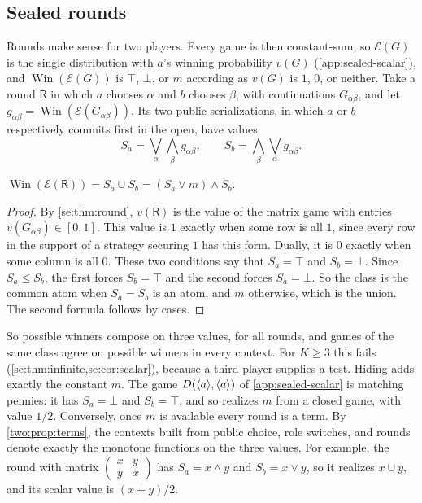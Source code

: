 \subsection{Sealed rounds}

Rounds make sense for two players. Every game is then constant-sum, so $\mathcal E(G)$ is the single distribution with $a$'s winning probability $v(G)$ (\cref{app:sealed-scalar}), and $\operatorname{Win}(\mathcal E(G))$ is $\top$, $\bot$, or $m$ according as $v(G)$ is $1$, $0$, or neither. Take a round $\mathsf R$ in which $a$ chooses $\alpha$ and $b$ chooses $\beta$, with continuations $G_{\alpha\beta}$, and let $g_{\alpha\beta}=\operatorname{Win}(\mathcal E(G_{\alpha\beta}))$. Its two public serializations, in which $a$ or $b$ respectively commits first in the open, have values
\[
 S_a=\bigvee_\alpha\bigwedge_\beta g_{\alpha\beta},\qquad
 S_b=\bigwedge_\beta\bigvee_\alpha g_{\alpha\beta}.
\]

\begin{proposition}[Rounds]\label{two:prop:rounds}
$\operatorname{Win}(\mathcal E(\mathsf R))=S_a\cup S_b=(S_a\lor m)\land S_b$.
\end{proposition}
\begin{proof}
By \cref{se:thm:round}, $v(\mathsf R)$ is the value of the matrix game with entries $v(G_{\alpha\beta})\in[0,1]$. This value is $1$ exactly when some row is all $1$, since every row in the support of a strategy securing $1$ has this form. Dually, it is $0$ exactly when some column is all $0$. These two conditions say that $S_a=\top$ and $S_b=\bot$. Since $S_a\leq S_b$, the first forces $S_b=\top$ and the second forces $S_a=\bot$. So the class is the common atom when $S_a=S_b$ is an atom, and $m$ otherwise, which is the union. The second formula follows by cases.
\end{proof}

So possible winners compose on three values, for all rounds, and games of the same class agree on possible winners in every context. For $K\geq3$ this fails (\cref{se:thm:infinite,se:cor:scalar}), because a third player supplies a test. Hiding adds exactly the constant $m$. The game $D(\langle a\rangle,\langle a\rangle)$ of \cref{app:sealed-scalar} is matching pennies: it has $S_a=\bot$ and $S_b=\top$, and so realizes $m$ from a closed game, with value $1/2$. Conversely, once $m$ is available every round is a term. By \cref{two:prop:terms}, the contexts built from public choice, role switches, and rounds denote exactly the monotone functions on the three values. For example, the round with matrix $\left(\begin{smallmatrix}x&y\\y&x\end{smallmatrix}\right)$ has $S_a=x\land y$ and $S_b=x\lor y$, so it realizes $x\cup y$, and its scalar value is $(x+y)/2$.

